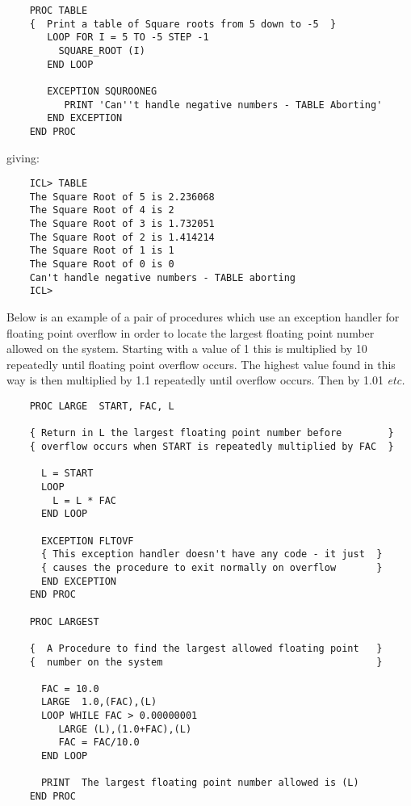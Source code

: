\documentclass[twoside,11pt]{report}
\begin{document}
\begin{verbatim}
    PROC TABLE
    {  Print a table of Square roots from 5 down to -5  }
       LOOP FOR I = 5 TO -5 STEP -1
         SQUARE_ROOT (I)
       END LOOP

       EXCEPTION SQUROONEG
          PRINT 'Can''t handle negative numbers - TABLE Aborting'
       END EXCEPTION
    END PROC
\end{verbatim}

giving:

\begin{verbatim}
    ICL> TABLE
    The Square Root of 5 is 2.236068
    The Square Root of 4 is 2
    The Square Root of 3 is 1.732051
    The Square Root of 2 is 1.414214
    The Square Root of 1 is 1
    The Square Root of 0 is 0
    Can't handle negative numbers - TABLE aborting
    ICL>
\end{verbatim}

Below is an example of a pair of procedures which use an exception handler
for floating point overflow in order to locate the largest floating point 
number allowed on the system. Starting with a value of 1 this is multiplied
by 10 repeatedly until floating point overflow occurs. The highest value
found in this way is then multiplied by 1.1 repeatedly until overflow occurs.
Then by 1.01 {\em etc.}

\begin{verbatim}
    PROC LARGE  START, FAC, L

    { Return in L the largest floating point number before        }
    { overflow occurs when START is repeatedly multiplied by FAC  }

      L = START
      LOOP
        L = L * FAC
      END LOOP
   
      EXCEPTION FLTOVF
      { This exception handler doesn't have any code - it just  }
      { causes the procedure to exit normally on overflow       }
      END EXCEPTION
    END PROC

    PROC LARGEST

    {  A Procedure to find the largest allowed floating point   }
    {  number on the system                                     }

      FAC = 10.0
      LARGE  1.0,(FAC),(L)
      LOOP WHILE FAC > 0.00000001
         LARGE (L),(1.0+FAC),(L)
         FAC = FAC/10.0
      END LOOP

      PRINT  The largest floating point number allowed is (L)
    END PROC
\end{verbatim}          
\end{document}
